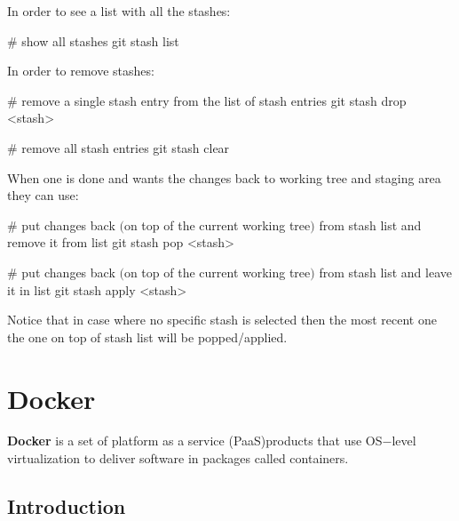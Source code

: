 In order to see a list with all the stashes:

\begin{bash}
# show all stashes
git stash list
\end{bash}

In order to remove stashes:

\begin{bash}
# remove a single stash entry from the list of stash entries
git stash drop <stash>
\end{bash}

\begin{bash}
# remove all stash entries
git stash clear
\end{bash}

When one is done and wants the changes back to working tree and staging area they can use:

\begin{bash}
# put changes back $($on top of the current working tree$)$ from stash list and remove it from list
git stash pop <stash>
\end{bash}

\begin{bash}
# put changes back $($on top of the current working tree$)$ from stash list and leave it in list
git stash apply <stash>
\end{bash}

Notice that in case where no specific stash is selected then the most recent one the one on top of stash list will be
popped/applied.

\newpage

\section{Docker}


\bd[Docker]
\textbf{Docker} is a set of platform as a service (PaaS)\footnotemark products that use OS$-$level virtualization to
deliver software in packages called containers.
\ed


\subsection{Introduction}


